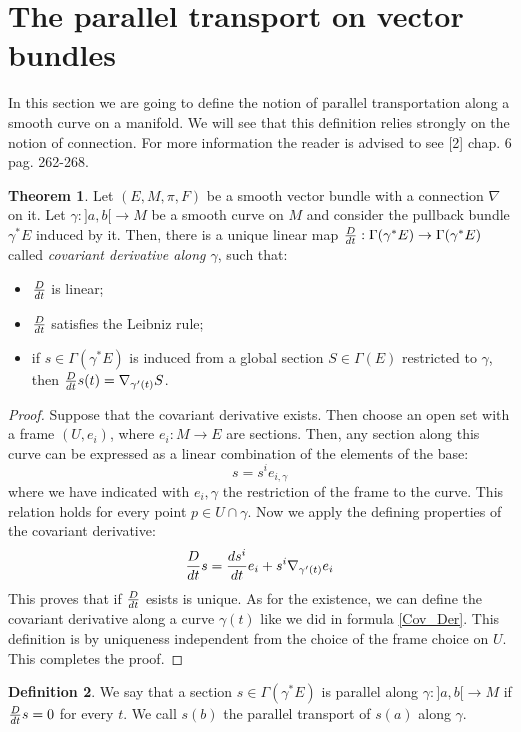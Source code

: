 \documentclass[12pt,a4paper]{report}
\theoremstyle{definition}
\newtheorem{Def}{Definition}[chapter]
\theoremstyle{Theorem}
\newtheorem{Theo}[Def]{Theorem}
\theoremstyle{definition}
\theoremstyle{definition}
\begin{document}
	\section{The parallel transport on vector bundles}
	In this section we are going to define the notion of parallel transportation along a smooth curve on a manifold. We will see that this definition relies strongly on the notion of connection. For more information the reader is advised to see [2] chap. 6 pag. 262-268.
	\begin{Theo}
		Let $(E,M,\pi,F)$ be a smooth vector bundle with a connection $\nabla$ on it. Let $\gamma:]a,b[\rightarrow M$ be a smooth curve on $M$ and consider the pullback bundle $\gamma^*E$ induced by it. Then, there is a unique linear map ${D\over dt}:\Gamma(\gamma^*E)\rightarrow \Gamma(\gamma^*E)$ called \textit{covariant derivative along $\gamma$}, such that:
		\begin{itemize}
			\item ${D\over dt}$ is linear;
			\item ${D\over dt}$ satisfies the Leibniz rule;
			\item if $s\in \Gamma(\gamma^*E)$ is induced from a global section $S\in\Gamma(E)$ restricted to $\gamma$, then ${D\over dt}s(t)=\nabla_{\gamma'(t)}S$.
		\end{itemize}
	\end{Theo}
	\begin{proof}
		Suppose that the covariant derivative exists. Then choose an open set with a frame $(U,{e_i})$, where $e_i:M\rightarrow
		E$ are sections. Then, any section along this curve can be expressed as a linear combination of the elements of the base:
		$$s=s^ie_{i,\gamma}$$
		where we have indicated with $e_i,{\gamma}$ the restriction of the frame to the curve. This relation holds for every point $p\in U\cap\gamma$. Now we apply the defining properties of the covariant derivative:
		\begin{equation}\label{Cov_Der}
			{D\over dt}s={ds^i\over dt}e_i+s^i\nabla_{\gamma'(t)}e_i	
		\end{equation}
		This proves that if $D\over dt$ esists is unique. As for the existence, we can define the covariant derivative along a curve $\gamma(t)$ like we did in formula \ref{Cov_Der}. This definition is by uniqueness independent from the choice of the frame choice on $U$. This completes the proof.
	\end{proof}
	\begin{Def}
		We say that a section $s\in\Gamma(\gamma^*E)$ is parallel along $\gamma:]a,b[\rightarrow M$ if ${D\over dt}s=0$ for every $t$. We call $s(b)$ the parallel transport of $s(a)$ along $\gamma$.
	\end{Def}
\end{document}
